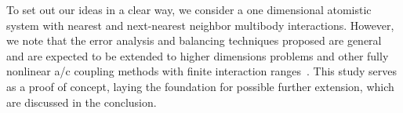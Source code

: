 

To set out our ideas in a clear way, we consider a one dimensional atomistic system with nearest and next-nearest neighbor multibody interactions. However, we note that the error analysis and balancing techniques proposed are general and are expected to be extended to higher dimensions problems and other fully nonlinear a/c coupling methods with finite interaction ranges~\cite{wang2024theoretical, ortner2023framework}. This study serves as a proof of concept, laying the foundation for possible further extension, which are discussed in the conclusion.

